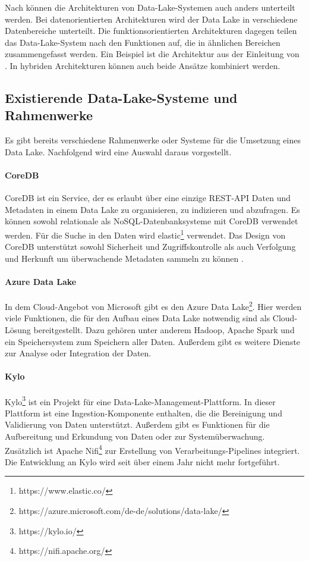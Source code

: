 Nach \textcite{sawadogo2021data} können die Architekturen von Data-Lake-Systemen auch anders unterteilt werden.
Bei datenorientierten Architekturen wird der Data Lake in verschiedene Datenbereiche unterteilt.
Die funktionsorientierten Architekturen dagegen teilen das Data-Lake-System nach den Funktionen auf, die in ähnlichen Bereichen zusammengefasst werden.
Ein Beispiel ist die Architektur aus der Einleitung von \textcite{datalake_03}.
In hybriden Architekturen können auch beide Ansätze kombiniert werden.

\subsection{Existierende Data-Lake-Systeme und Rahmenwerke}
Es gibt bereits verschiedene Rahmenwerke oder Systeme für die Umsetzung eines Data Lake.
Nachfolgend wird eine Auswahl daraus vorgestellt.

\paragraph{CoreDB} CoreDB ist ein Service, der es erlaubt über eine einzige REST-API Daten und Metadaten in einem Data Lake zu organisieren, zu indizieren und abzufragen.
Es können sowohl relationale als NoSQL-Datenbanksysteme mit CoreDB verwendet werden.
Für die Suche in den Daten wird elastic\footnote{https://www.elastic.co/} verwendet.
Das Design von CoreDB unterstützt sowohl Sicherheit und Zugriffskontrolle als auch Verfolgung und Herkunft um überwachende Metadaten sammeln zu können \parencite{coredb}.

\paragraph{Azure Data Lake} In dem Cloud-Angebot von Microsoft gibt es den Azure Data Lake\footnote{https://azure.microsoft.com/de-de/solutions/data-lake/}.
Hier werden viele Funktionen, die für den Aufbau eines Data Lake notwendig sind als Cloud-Lösung bereitgestellt.
Dazu gehören unter anderem Hadoop, Apache Spark und ein Speichersystem zum Speichern aller Daten.
Außerdem gibt es weitere Dienste zur Analyse oder Integration der Daten.

\paragraph{Kylo} Kylo\footnote{https://kylo.io/} ist ein Projekt für eine Data-Lake-Management-Plattform.
In dieser Plattform ist eine Ingestion-Komponente enthalten, die die Bereinigung und Validierung von Daten unterstützt.
Außerdem gibt es Funktionen für die Aufbereitung und Erkundung von Daten oder zur Systemüberwachung.
Zusätzlich ist Apache Nifi\footnote{https://nifi.apache.org/} zur Erstellung von Verarbeitungs-Pipelines integriert.
Die Entwicklung an Kylo wird seit über einem Jahr nicht mehr fortgeführt.

